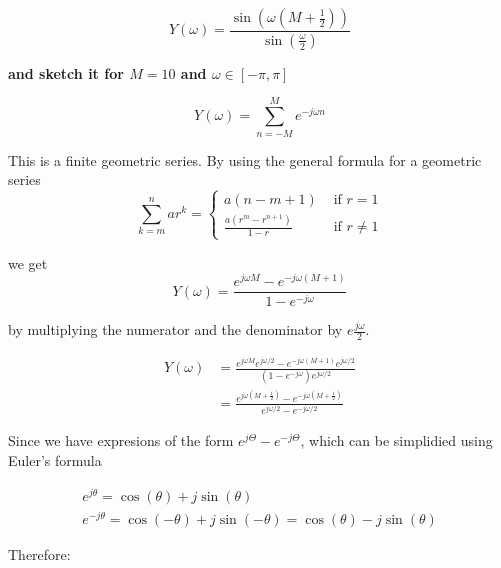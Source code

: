 \begin{equation*}
    Y(\omega)=\frac{\sin \left(\omega\left(M+\frac{1}{2}\right)\right)}{\sin \left(\frac{\omega}{2}\right)} 
\end{equation*}

\textbf{and sketch it for $M=10$ and $\omega \in [-\pi,\pi]$}

\begin{equation*}
    Y(\omega)=\sum_{n=-M}^M e^{-j\omega n}
\end{equation*}

This is a finite geometric series. By using the general formula for a geometric series
\begin{equation*}
    \sum_{k=m}^{n} a r^{k}=\left\{\begin{array}{ll}a(n-m+1) & \text { if } r=1 \\ \frac{a\left(r^{m}-r^{n+1}\right)}{1-r} & \text { if } r \neq 1\end{array}\right. 
\end{equation*}

we get
\begin{equation*}
    Y(\omega)=\frac{e^{j\omega M}-e^{-j\omega (M+1)}}{1-e^{-j\omega}}
\end{equation*}

by multiplying the numerator and the denominator by $e\frac{j\omega}{2}$.

\begin{equation*}
    \begin{aligned} Y(\omega) & =\frac{e^{j \omega M} e^{j \omega / 2}-e^{-j \omega(M+1)} e^{j \omega / 2}}{\left(1-e^{-j \omega}\right) e^{j \omega / 2}} \\ & =\frac{e^{j \omega\left(M+\frac{1}{2}\right)}-e^{-j \omega\left(M+\frac{1}{2}\right)}}{e^{j \omega / 2}-e^{-j \omega / 2}}\end{aligned}
\end{equation*}

Since we have expresions of the form $e^{j\Theta}-e^{-j\Theta}$, which can be simplidied using Euler's formula

\begin{equation*}
    \begin{array}{c}e^{j \theta}=\cos (\theta)+j \sin (\theta) \\ e^{-j \theta}=\cos (-\theta)+j \sin (-\theta)=\cos (\theta)-j \sin (\theta)\end{array} 
\end{equation*}

Therefore:

